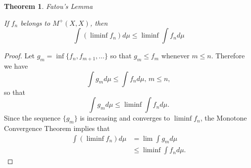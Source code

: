 \documentclass[12pt]{amsart}
\theoremstyle{plain}
\newtheorem{thm}{Theorem}[section]
\theoremstyle{definition}
\theoremstyle{remark}
\numberwithin{equation}{section}
\numberwithin{thm}{section}
\begin{document}
\begin{thm}{Fatou's Lemma}

If \(f_n\) belongs to \(M^+(X, X)\), then 
\[ 
\int (\liminf f_n) d\mu \leq \liminf \int f_n d \mu
\]
\end{thm}
\begin{proof}
    Let $g_m = \inf \{f_n,f_{m+1},...\}$ so that $g_m \leq f_m$ whenever $m \leq n$. Therefore we have
    \begin{equation*}
        \int g_m d\mu \leq \int f_n d\mu \text{, }  m \leq n ,
    \end{equation*}
    so that
    \begin{equation*}
        \int g_m d\mu \leq \liminf \int f_n d\mu.
    \end{equation*}
    Since the sequence $\{g_m\}$ is increasing and converges to $\liminf f_n$, the Monotone Convergence Theorem implies that 
    \begin{equation*}
    \begin{aligned}
        \int (\liminf f_n) d\mu  &= \lim \int g_m d\mu \\
        & \leq \liminf \int f_n d\mu.
    \end{aligned}        
    \end{equation*}
\end{proof}
\end{document}
